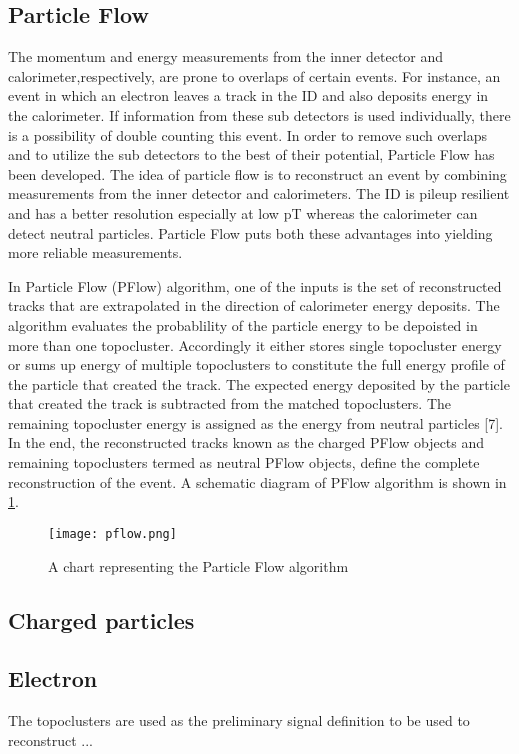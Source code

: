 \subsection{Particle Flow}
The momentum and energy measurements from the inner detector and calorimeter,respectively, are prone
to overlaps of certain events. For instance, an event in which an electron leaves a track in the ID and also
deposits energy in the calorimeter. If information from these sub detectors is used individually, there is a
possibility of double counting this event. In order to remove such overlaps and to utilize the sub detectors to
the best of their potential, Particle Flow has been developed. The idea of particle flow is to reconstruct an
event by combining measurements from the inner detector and calorimeters. The ID is pileup resilient and
has a better resolution especially at low pT whereas the calorimeter can detect neutral particles. Particle
Flow puts both these advantages into yielding more reliable measurements.

In Particle Flow (PFlow) algorithm, one of the inputs is the set of reconstructed tracks that are extrapolated
in the direction of calorimeter energy deposits. The algorithm evaluates the probablility of the particle
energy to be depoisted in more than one topocluster. Accordingly it either stores single topocluster energy
or sums up energy of multiple topoclusters to constitute the full energy profile of the particle that created the
track. The expected energy deposited by the particle that created the track is subtracted from the matched
topoclusters. The remaining topocluster energy is assigned as the energy from neutral particles [7]. In the
end, the reconstructed tracks known as the charged PFlow objects and remaining topoclusters termed as
neutral PFlow objects, define the complete reconstruction of the event. A schematic diagram of PFlow
algorithm is shown in \cref{fig:pflow}.

\begin{figure}[htbp]
    \centering
    \texttt{[image: pflow.png]}
    \caption[Particle flow overview]{A chart representing the Particle Flow algorithm~\cite{Aaboud:2257597}}%
    \label{fig:pflow}
\end{figure}

\subsection{Charged particles}
\subsection*{Electron}
The topoclusters are used as
the preliminary signal definition to be used to reconstruct ...
